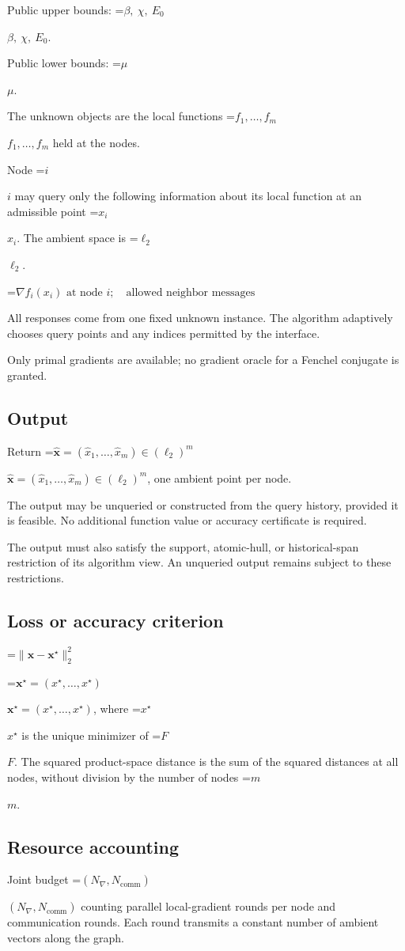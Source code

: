\documentclass[10pt,a4paper]{article}
\newcommand{\AtlasMath}[1]{\par\begingroup\centering\setbox0=\hbox{$\displaystyle #1$}\ifdim\wd0>1.4\linewidth\typeout{ATLAS WIDE FORMULA: \the\wd0}\fi\ifdim\wd0>\linewidth\resizebox{\linewidth}{!}{\box0}\else\box0\fi\par\endgroup}
\newcommand{\AtlasInlineMath}[1]{\begingroup\setbox0=\hbox{$#1$}\ifdim\wd0>.4\linewidth\endgroup\AtlasMath{#1}\else\endgroup$#1$\fi}
\begin{document}
Public upper bounds: \AtlasInlineMath{\beta,\ \chi,\ E_0}.

Public lower bounds: \AtlasInlineMath{\mu}.

The unknown objects are the local functions \AtlasInlineMath{f_1,\ldots,f_m} held at the nodes.

Node \AtlasInlineMath{i} may query only the following information about its local function at an admissible point \AtlasInlineMath{x_i}. The ambient space is \AtlasInlineMath{\ell_2}.


\AtlasMath{\nabla f_i(x_i)\text{ at node }i;\quad\text{allowed neighbor messages}}


All responses come from one fixed unknown instance. The algorithm adaptively chooses query points and any indices permitted by the interface.

Only primal gradients are available; no gradient oracle for a Fenchel conjugate is granted.

\subsection{Output}
Return \AtlasInlineMath{\widehat{\boldsymbol x}=(\widehat x_1,\ldots,\widehat x_m)\in(\ell_2)^m}, one ambient point per node.

The output may be unqueried or constructed from the query history, provided it is feasible. No additional function value or accuracy certificate is required.

The output must also satisfy the support, atomic-hull, or historical-span restriction of its algorithm view. An unqueried output remains subject to these restrictions.

\subsection{Loss or accuracy criterion}

\AtlasMath{\|\boldsymbol x-\boldsymbol x^\star\|_2^2}


\AtlasInlineMath{\boldsymbol{x}^\star=(x^\star,\ldots,x^\star)}, where \AtlasInlineMath{x^\star} is the unique minimizer of \AtlasInlineMath{F}. The squared product-space distance is the sum of the squared distances at all nodes, without division by the number of nodes \AtlasInlineMath{m}.

\subsection{Resource accounting}
Joint budget \AtlasInlineMath{(N_\nabla,N_{\mathrm{comm}})} counting parallel local-gradient rounds per node and communication rounds. Each round transmits a constant number of ambient vectors along the graph.
\end{document}
